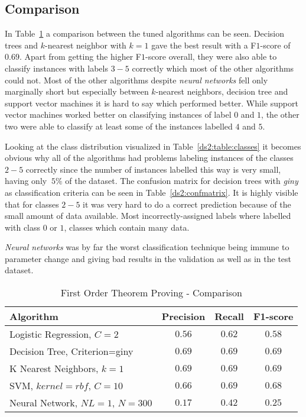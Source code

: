 \subsection{Comparison}
In Table~\ref{ds2:table:comparison} a comparison between the tuned algorithms can be seen. Decision trees and $k$-nearest neighbor with $k=1$ gave the best result with a F$1$-score of $0.69$. Apart from getting the higher F$1$-score overall, they were also able to classify instances with labels $3-5$ correctly which most of the other algorithms could not. Most of the other algorithms despite \textit{neural networks} fell only	marginally short but especially between $k$-nearest neighbors, decision tree and support vector machines it is hard to say which performed better. While support vector machines worked better on classifying instances of label $0$ and $1$, the other two were able to classify at least some of the instances labelled $4$ and $5$.
\par Looking at the class distribution visualized in Table~\ref{ds2:table:classes} it becomes obvious why all of the algorithms had problems labeling instances of the classes $2-5$ correctly since the number of instances labelled this way is very small, having only $~5\%$ of the dataset. The confusion matrix for decision trees with \textit{giny} as classification criteria can be seen in Table~\ref{ds2:confmatrix}. It is highly visible that for classes $2-5$ it was very hard to do a correct prediction because of the small amount of data available. Most incorrectly-assigned labels where labelled with class $0$ or $1$, classes which contain many data.
\par \textit{Neural networks} was by far the worst classification technique being immune to parameter change and giving bad results in the validation as well as in the test dataset.

\begin{table}[p]
\begin{center}
\begin{tabular}{|p{5cm}|c|c|c|}
\hline Algorithm & Precision & Recall & F1-score  \\
\hline Logistic Regression, $C=2$ & $0.56$ & $0.62$ & $0.58$ \\
\hline Decision Tree, Criterion=giny& $0.69$ & $0.69$ & $\mathbf{0.69}$ \\
\hline K Nearest Neighbors, $k=1$ & $0.69$ & $0.69$ & $\mathbf{0.69}$ \\
\hline SVM, $kernel=rbf$, $C=10$ & $0.66$ & $0.69$ & $0.68$ \\
\hline Neural Network, $NL=1$, $N=300$ & $0.17$ & $0.42$ & $0.25$ \\
\hline
\end{tabular}
\caption{First Order Theorem Proving - Comparison}
\label{ds2:table:comparison}
\end{center}
\end{table}



